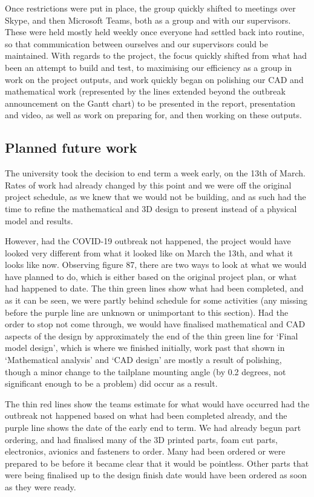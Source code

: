 \documentclass[../../main.tex]{subfiles}
\begin{document}
Once restrictions were put in place, the group quickly shifted to meetings over Skype, and then Microsoft Teams, both as a group and with our supervisors.
These were held mostly held weekly once everyone had settled back into routine, so that communication between ourselves and our supervisors could be maintained.
With regards to the project, the focus quickly shifted from what had been an attempt to build and test, to maximising our efficiency as a group in work on the project outputs, and work quickly began on polishing our CAD and mathematical work (represented by the lines extended beyond the outbreak announcement on the Gantt chart) to be presented in the report, presentation and video, as well as work on preparing for, and then working on these outputs. 

\subsection{Planned future work} \label{sec:project-review:planned-future-work}

The university took the decision to end term a week early, on the 13th of March.
Rates of work had already changed by this point and we were off the original project schedule, as we knew that we would not be building, and as such had the time to refine the mathematical and 3D design to present instead of a physical model and results.  

However, had the COVID-19 outbreak not happened, the project would have looked very different from what it looked like on March the 13th, and what it looks like now.
Observing figure 87, there are two ways to look at what we would have planned to do, which is either based on the original project plan, or what had happened to date.
The thin green lines show what had been completed, and as it can be seen, we were partly behind schedule for some activities (any missing before the purple line are unknown or unimportant to this section).
Had the order to stop not come through, we would have finalised mathematical and CAD aspects of the design by approximately the end of the thin green line for ‘Final model design’, which is where we finished initially, work past that shown in ‘Mathematical analysis’ and ‘CAD design’ are mostly a result of polishing, though a minor change to the tailplane mounting angle (by 0.2 degrees, not significant enough to be a problem) did occur as a result.  

The thin red lines show the teams estimate for what would have occurred had the outbreak not happened based on what had been completed already, and the purple line shows the date of the early end to term.
We had already begun part ordering, and had finalised many of the 3D printed parts, foam cut parts, electronics, avionics and fasteners to order.
Many had been ordered or were prepared to be before it became clear that it would be pointless.
Other parts that were being finalised up to the design finish date would have been ordered as soon as they were ready.  
\end{document}
